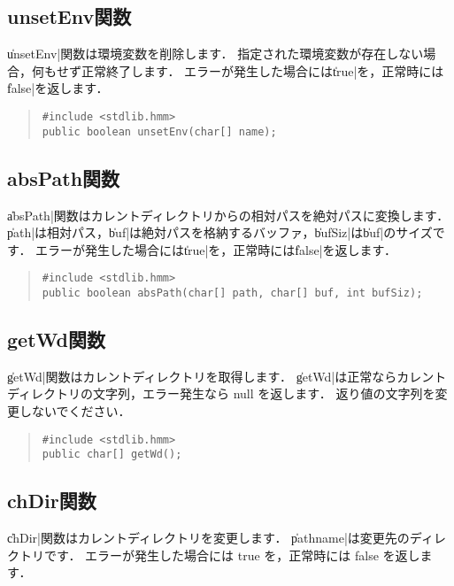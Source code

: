 \subsection{unsetEnv関数}

\|unsetEnv|関数は環境変数を削除します．
指定された環境変数が存在しない場合，何もせず正常終了します．
エラーが発生した場合には\|true|を，正常時には\|false|を返します．

\begin{quote}
\begin{verbatim}
#include <stdlib.hmm>
public boolean unsetEnv(char[] name);
\end{verbatim}
\end{quote}

\subsection{absPath関数}

\|absPath|関数はカレントディレクトリからの相対パスを絶対パスに変換します．
\|path|は相対パス，\|buf|は絶対パスを格納するバッファ，\|bufSiz|は\|buf|のサイズです．
エラーが発生した場合には\|true|を，正常時には\|false|を返します．

\begin{quote}
\begin{verbatim}
#include <stdlib.hmm>
public boolean absPath(char[] path, char[] buf, int bufSiz);
\end{verbatim}
\end{quote}

\subsection{getWd関数}

\|getWd|関数はカレントディレクトリを取得します．
\|getWd|は正常ならカレントディレクトリの文字列，エラー発生なら null を返します．
返り値の文字列を変更しないでください．

\begin{quote}
\begin{verbatim}
#include <stdlib.hmm>
public char[] getWd();
\end{verbatim}
\end{quote}

\subsection{chDir関数}

\|chDir|関数はカレントディレクトリを変更します．
\|pathname|は変更先のディレクトリです．
エラーが発生した場合には true を，正常時には false を返します．

